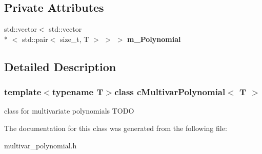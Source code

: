 \subsection*{Private Attributes}
\begin{DoxyCompactItemize}
\item 
\hypertarget{classcMultivarPolynomial_a01b0fbc4aee3f1c77b9c5de8b89e5768}{std\-::vector$<$ std\-::vector\\*
$<$ std\-::pair$<$ size\-\_\-t, T $>$ $>$ $>$ {\bfseries m\-\_\-\-Polynomial}}\label{classcMultivarPolynomial_a01b0fbc4aee3f1c77b9c5de8b89e5768}

\end{DoxyCompactItemize}


\subsection{Detailed Description}
\subsubsection*{template$<$typename T$>$class c\-Multivar\-Polynomial$<$ T $>$}

class for multivariate polynomials T\-O\-D\-O 

The documentation for this class was generated from the following file\-:\begin{DoxyCompactItemize}
\item 
multivar\-\_\-polynomial.\-h\end{DoxyCompactItemize}
